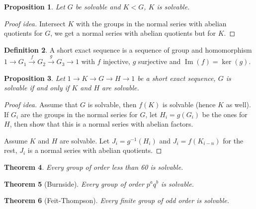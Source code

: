 \documentclass[paper=a4, fontsize=12pt]{scrartcl} %
\newtheorem{thm}{Theorem}[section]
\newtheorem{prop}[thm]{Proposition}
\theoremstyle{definition}
\newtheorem{defn}[thm]{Definition}
\theoremstyle{remark}
\DeclareMathOperator{\im}{Im}
\numberwithin{equation}{section} %
\numberwithin{figure}{section} %
\numberwithin{table}{section} %
\begin{document}
\begin{prop}
	Let $G$ be solvable and $K <G$, $K$ is solvable.
\end{prop}
\begin{proof}[Proof idea]
	Intersect $K$ with the groups in the normal series with abelian quotients for $G$, we get a normal series with abelian quotients but for $K$.
\end{proof}
\begin{defn}
	A short exact sequence is a sequence of group and homomorphism $1 \rightarrow G_1 \stackrel{f}{\rightarrow} G_2 \stackrel{g}{\rightarrow} G_3 \rightarrow 1$ with $f$ injective, $g$ surjective and $\im(f) = \ker(g)$.
\end{defn}
\begin{prop}
	Let $1 \rightarrow K \rightarrow G \rightarrow H \rightarrow 1$ be a short exact sequence, $G$ is solvable if and only if $K$ and $H$ are solvable.
\end{prop}
\begin{proof}[Proof idea]
	Assume that $G$ is solvable, then $f(K)$ is solvable (hence $K$ as well). If $G_i$ are the groups in the normal series for $G$, let $H_i= g(G_i)$ be the ones for $H$, then show that this is a normal series with abelian factors.
	
	Assume $K$ and $H$ are solvable. Let $J_i = g^{-1}(H_i)$ and $J_i = f(K_{i-n})$ for the rest, $J_i$ is a normal series with abelian quotients.
\end{proof}
\begin{thm}
	Every group of order less than 60 is solvable.
\end{thm}
\begin{thm}[Burnside]
	Every group of order $p^aq^b$ is solvable.
\end{thm}
\begin{thm}[Feit-Thompson]
	Every finite group of odd order is solvable.
\end{thm}
\end{document}
